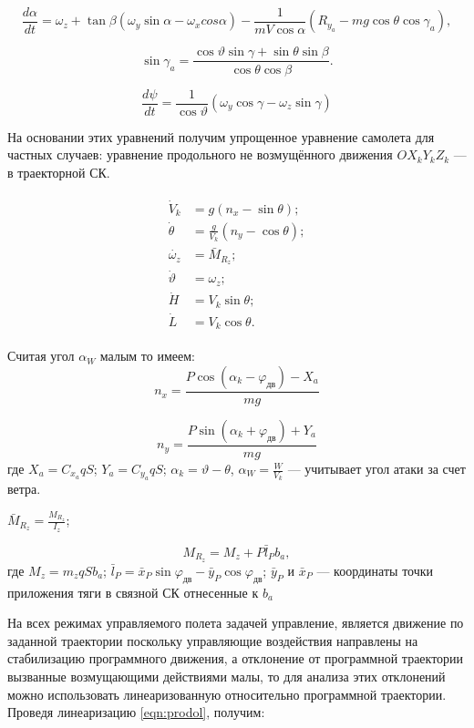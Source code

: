 \documentclass{article}
\begin{document}
\[
    \frac{d\alpha}{dt} = \omega_z + \tan{\beta}(\omega_y \sin{\alpha} -
    \omega_x cos{\alpha}) - \frac{1}{mV \cos{\alpha}} (R_{y_a} - mg\cos{\theta}
    \cos{\gamma_a}),
\]

\[
    \sin{\gamma_a} = \frac{\cos{\vartheta} \sin{\gamma} + \sin{\theta}
    \sin{\beta}}{\cos{\theta} \cos{\beta}}.
\]

\[
    \frac{d\psi}{dt} = \frac{1}{\cos{\vartheta}}(\omega_y \cos{\gamma} -
    \omega_z \sin{\gamma})
\]

На основании этих уравнений получим упрощенное уравнение самолета для частных
случаев:
уравнение продольного не возмущённого движения $OX_k Y_k Z_k$ --- в траекторной
СК.

\begin{align}
    \label{eqn:prodol}
    \begin{split}
        \dot{V}_k&= g(n_x - \sin{\theta});
        \\
        \dot{\theta}&= \frac{g}{V_k} (n_y - \cos{\theta});
        \\
        \dot{\omega_z}&= \bar{M}_{R_z};
        \\
        \dot{\vartheta}&= \omega_{z};
        \\
        \dot{H}&= V_k \sin{\theta};
        \\
        \dot{L}&= V_k \cos{\theta}.
    \end{split}
\end{align}

Считая угол $\alpha_W$ малым то имеем:
\[
    n_x = \frac{P\cos{(\alpha_k - \varphi_\text{дв})} - X_a}{mg}
\]

\[
    n_y = \frac{P \sin{(\alpha_k + \varphi_\text{дв})} + Y_a}{mg}
\]
где $X_a = C_{x_a} q S$; $Y_a = C_{y_a} q S$; $\alpha_k = \vartheta - \theta$,
$\alpha_W = \frac{W}{V_k}$ --- учитывает угол атаки за счет ветра.

$\bar{M}_{R_z} = \frac{M_{R_z}}{I_z}$;

\[
    M_{R_z} = M_z + P \bar{l}_P b_a,
\]
где $M_z = m_z q S b_a$; $\bar{l}_P = \bar{x}_P \sin{\varphi_\text{дв}} -
\bar{y}_P \cos{\varphi_\text{дв}}$; $\bar{y}_P$ и $\bar{x}_P$ --- координаты
точки приложения тяги в связной СК отнесенные к $b_a$

На всех режимах управляемого полета задачей управление, является движение по
заданной траектории поскольку управляющие воздействия направлены на
стабилизацию программного движения, а отклонение от программной траектории
вызванные возмущающими действиями малы, то для анализа этих отклонений можно
использовать линеаризованную относительно программной траектории. Проведя
линеаризацию
\eqref{eqn:prodol}, получим:
\end{document}

